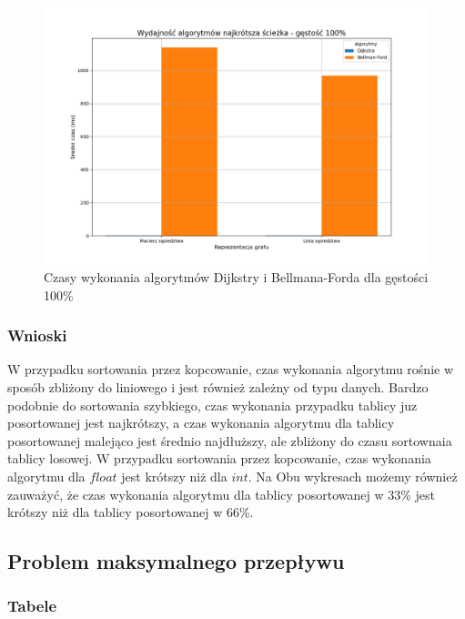 \documentclass{article}
\begin{document}
\begin{figure}[H]
    \centering
    \includegraphics[scale=0.5]{../Python/charts_type2/Typ2_SHORTEST_PATH_gestosc100_wykres.png}
    \caption{Czasy wykonania algorytmów Dijkstry i Bellmana-Forda dla gęstości 100\%}
\end{figure}

\subsubsection{Wnioski}
W przypadku sortowania przez kopcowanie, czas wykonania algorytmu rośnie w sposób zbliżony do liniowego i jest również zależny od typu danych.
Bardzo podobnie do sortowania szybkiego, czas wykonania przypadku tablicy juz posortowanej jest najkrótszy, a czas wykonania algorytmu dla tablicy posortowanej malejąco jest średnio najdłuższy, ale zbliżony do czasu sortownaia tablicy losowej.
W przypadku sortowania przez kopcowanie, czas wykonania algorytmu dla $float$ jest krótszy niż dla $int$. Na Obu
wykresach możemy również zauważyć, że czas wykonania algorytmu dla tablicy posortowanej w 33\% jest krótszy niż dla tablicy posortowanej w 66\%.

\subsection{Problem maksymalnego przepływu}

\subsubsection{Tabele}
\datatable
\end{document}
